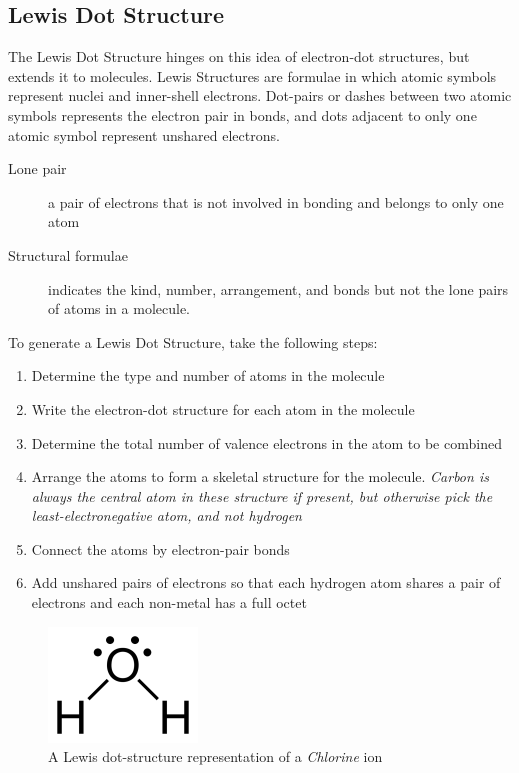 \subsection{Lewis Dot Structure}
The Lewis Dot Structure hinges on this idea of electron-dot structures, but
extends it to molecules.  Lewis Structures are formulae in which atomic symbols
represent nuclei and inner-shell electrons.  Dot-pairs or dashes between two
atomic symbols represents the electron pair in bonds, and dots adjacent to only
one atomic symbol represent unshared electrons.

\begin{description}
  \item[Lone pair] a pair of electrons that is not involved in bonding and
    belongs to only one atom
  \item[Structural formulae] indicates the kind, number, arrangement, and bonds
    but not the lone pairs of atoms in a molecule.
\end{description}

To generate a Lewis Dot Structure, take the following steps:

\begin{enumerate}
  \item Determine the type and number of atoms in the molecule
  \item Write the electron-dot structure for each atom in the molecule
  \item Determine the total number of valence electrons in the atom to be
    combined
  \item Arrange the atoms to form a skeletal structure for the molecule.
    \textit{Carbon is always the central atom in these structure if present, but
    otherwise pick the least-electronegative atom, and not hydrogen}
  \item Connect the atoms by electron-pair bonds
  \item Add unshared pairs of electrons so that each hydrogen atom shares a pair
    of electrons and each non-metal has a full octet
\end{enumerate}

\begin{figure}[H]
  \includegraphics{res/lewis_structure_water.png}
  \caption{A Lewis dot-structure representation of a \textit{Chlorine} ion}
\end{figure}

